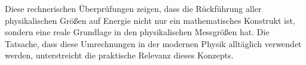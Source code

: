 \documentclass{article}
\begin{document}
	Diese rechnerischen Überprüfungen zeigen, dass die Rückführung aller physikalischen Größen auf Energie nicht nur ein mathematisches Konstrukt ist, sondern eine reale Grundlage in den physikalischen Messgrößen hat. Die Tatsache, dass diese Umrechnungen in der modernen Physik alltäglich verwendet werden, unterstreicht die praktische Relevanz dieses Konzepts.
	
\end{document}
